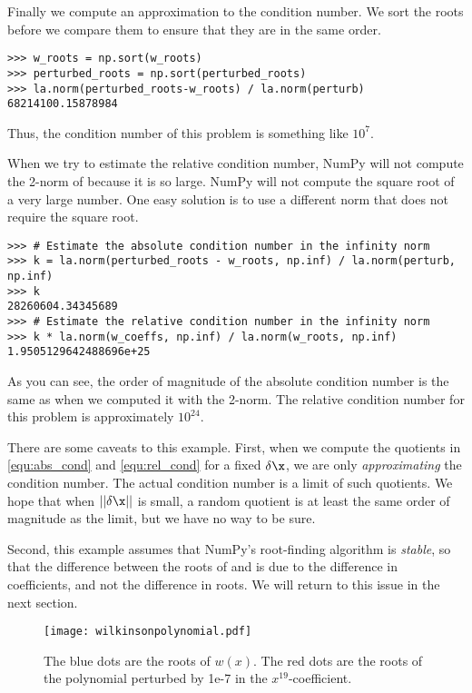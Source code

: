 Finally we compute an approximation to the condition number.
We sort the roots before we compare them to ensure that they are in the same order.
\begin{lstlisting}
>>> w_roots = np.sort(w_roots)
>>> perturbed_roots = np.sort(perturbed_roots)
>>> la.norm(perturbed_roots-w_roots) / la.norm(perturb)
68214100.15878984
\end{lstlisting}
Thus, the condition number of this problem is something like $10^7$.

When we try to estimate the relative condition number, NumPy will not compute the 2-norm of  because it is so large.
NumPy will not compute the square root of a very large number.
One easy solution is to use a different norm that does not require the square root.
\begin{lstlisting}
>>> # Estimate the absolute condition number in the infinity norm
>>> k = la.norm(perturbed_roots - w_roots, np.inf) / la.norm(perturb, np.inf)
>>> k
28260604.34345689
>>> # Estimate the relative condition number in the infinity norm
>>> k * la.norm(w_coeffs, np.inf) / la.norm(w_roots, np.inf)
1.9505129642488696e+25
\end{lstlisting}
As you can see, the order of magnitude of the absolute condition number is the same as when we computed it with the 2-norm.
The relative condition number for this problem is approximately $10^{24}$.


There are some caveats to this example.
First, when we compute the quotients in \eqref{equ:abs_cond} and \eqref{equ:rel_cond} for a fixed $\delta \x$, we are only \emph{approximating} the condition number.
The actual condition number is a limit of such quotients.
We hope that when $||\delta \x||$ is small, a random quotient is at least the same order of magnitude as the limit, but we have no way to be sure.

Second, this example assumes that NumPy's root-finding algorithm is \emph{stable}, so that the difference between the roots of  and  is due to the difference in coefficients, and not the difference in roots.
We will return to this issue in the next section.


\begin{figure}
\centering
\texttt{[image: wilkinsonpolynomial.pdf]}
\caption{The blue dots are the roots of $w(x)$. The red dots are the roots of the polynomial perturbed by 1e-7 in the $x^{19}$-coefficient. }
\label{fig:wilkinsonpolynomial}
\end{figure}


